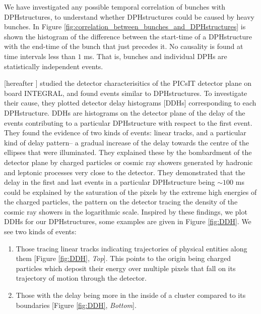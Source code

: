 We have investigated any possible temporal correlation of bunches with DPHstructures, to understand whether DPHstructures could be caused by heavy bunches. In Figure \ref{fig:correlation_between_bunches_and_DPHstructures} is shown the histogram of the difference between the start-time of a DPHstructure with the end-time of the bunch that just precedes it. No causality is found at time intervals less than $1$ ms. That is, bunches and individual DPHs are statistically independent events.


\cite{Segreto_et_al.-2003-A&A--INTEGRAL_cosmic_rays} [hereafter ] studied the detector characterisitics of the PICsIT detector plane on board INTEGRAL, and found events similar to DPHstructures. To investigate their cause, they plotted detector delay histograms [DDHs] corresponding to each DPHstructure. DDHs are histograms on the detector plane of the delay of the events contributing to a particular DPHstructure with respect to the first event. They found the evidence of two kinds of events: linear tracks, and a particular kind of delay pattern-- a gradual increase of the delay towards the centre of the ellipses that were illuminated. They explained these by the bombardment of the detector plane by charged particles or cosmic ray showers generated by hadronic and leptonic processes very close to the detector. They demonstrated that the delay in the first and last events in a particular DPHstructure being $\sim 100$ ms  could be explained by the saturation of the pixels by the extreme high energies of the charged particles, the pattern on the detector tracing the density of the cosmic ray showers in the logarithmic scale. Inspired by these findings, we plot DDHs for our DPHstructures, some examples are given in Figure \ref{fig:DDH}. We see two kinds of events:


\begin{enumerate}
\item Those tracing linear tracks indicating trajectories of physical entities along them [Figure \ref{fig:DDH}, \emph{Top}]. This points to the origin being charged particles which deposit their energy over multiple pixels that fall on its trajectory of motion through the detector.
\item Those with the delay being more in the inside of a cluster compared to its boundaries [Figure \ref{fig:DDH}, \emph{Bottom}].
\end{enumerate}

